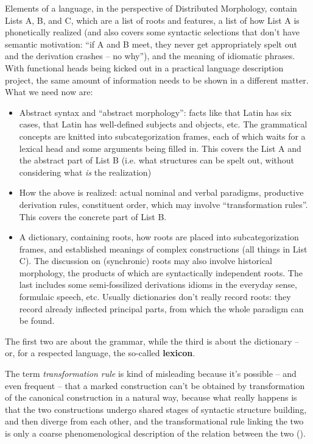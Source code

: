 \documentclass[a4paper, oneside]{report}
\newcommand*{\concept}[1]{\textbf{#1}}
\newcommand*{\term}[1]{\emph{#1}}
\begin{document}
Elements of a language, in the perspective of Distributed Morphology,
contain Lists A, B, and C, 
which are a list of roots and features, 
a list of how List A is phonetically realized 
(and also covers some syntactic selections that don't have semantic motivation: 
``if A and B meet, they never get appropriately spelt out and the derivation crashes -- no why''),
and the meaning of idiomatic phrases. 
With functional heads being kicked out in a practical language description project, 
the same amount of information needs to be shown in a different matter. 
What we need now are: 
\begin{itemize}
    \item Abstract syntax and ``abstract morphology'':
        facts like that Latin has six cases, 
        that Latin has well-defined subjects and objects, etc. 
        The grammatical concepts are knitted into subcategorization frames,
        each of which waits for a lexical head 
        and some arguments being filled in. 
        This covers the List A and the abstract part of List B 
        (i.e. what structures can be spelt out, 
        without considering what \emph{is} the realization)
    \item How the above is realized: 
        actual nominal and verbal paradigms, 
        productive derivation rules, 
        constituent order, which may involve ``transformation rules''.
        This covers 
        the concrete part of List B. 
    \item A dictionary, 
        containing roots, how roots are placed into subcategorization frames, 
        and established meanings of complex constructions (all things in List C). 
        The discussion on (synchronic) roots may also involve 
        historical morphology,
        the products of which are syntactically independent roots.
        The last includes some semi-fossilized derivations 
        idioms in the everyday sense, formulaic speech, etc. 
        Usually dictionaries don't really record roots: 
        they record already inflected principal parts,
        from which the whole paradigm can be found.
\end{itemize}
The first two are about the grammar, 
while the third is about the dictionary -- 
or, for a respected language, the so-called \concept{lexicon}.

The term \term{transformation rule} is kind of misleading 
because it's possible -- and even frequent -- 
that a marked construction can't be obtained by transformation 
of the canonical construction
in a natural way, 
because what really happens is 
that the two constructions undergo shared stages of syntactic structure building,
and then diverge from each other,
and the transformational rule linking the two 
is only a coarse phenomenological description of the relation between the two 
().
\end{document}
